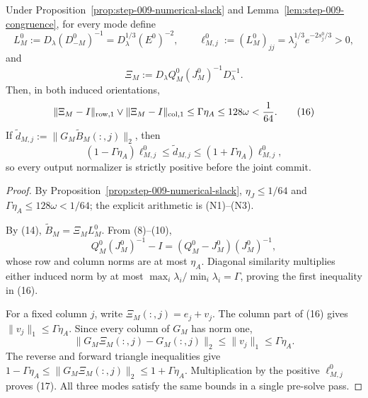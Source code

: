\begin{proposition}\label{prop:step-009-normalizer}
Under Proposition~\ref{prop:step-009-numerical-slack}
and Lemma~\ref{lem:step-009-congruence}, for
every mode define
\[
L_M^0:=D_\lambda(D_{-M}^0)^{-1}
   =D_\lambda^{1/3}(E^0)^{-2},\qquad
\ell_{M,j}^0:=(L_M^0)_{jj}
   =\lambda_j^{1/3}e^{-2s_j^0/3}>0,
\]
and
\[
\Xi_M:=D_\lambda Q_M^0(J_M^0)^{-1}D_\lambda^{-1}.
\]
Then, in both induced orientations,
\[
\|\Xi_M-I\|_{\rm row,1}\vee\|\Xi_M-I\|_{\rm col,1}
\le\Gamma\eta_A\le128\omega<\frac1{64}. \tag{16}
\]
If \(\widetilde d_{M,j}:=\|G_M\widetilde B_M(:,j)\|_2\), then
\[
(1-\Gamma\eta_A)\ell_{M,j}^0
\le\widetilde d_{M,j}
\le(1+\Gamma\eta_A)\ell_{M,j}^0, \tag{17}
\]
so every output normalizer is strictly positive before the joint commit.

\begin{proof}

By Proposition~\ref{prop:step-009-numerical-slack}, \(\eta_J\le1/64\) and
\(\Gamma\eta_A\le128\omega<1/64\); the explicit arithmetic is (N1)--(N3).

By (14), \(\widetilde B_M=\Xi_M L_M^0\). From (8)--(10),
\[
Q_M^0(J_M^0)^{-1}-I
=(Q_M^0-J_M^0)(J_M^0)^{-1},
\]
whose row and column norms are at most \(\eta_A\). Diagonal similarity
multiplies either induced norm by at most
\(\max_i\lambda_i/\min_i\lambda_i=\Gamma\), proving the first inequality
in (16).

For a fixed column \(j\), write \(\Xi_M(:,j)=e_j+v_j\). The column part of
(16) gives \(\|v_j\|_1\le\Gamma\eta_A\). Since every column of \(G_M\) has
norm one,
\[
\|G_M\Xi_M(:,j)-G_M(:,j)\|_2
\le\|v_j\|_1\le\Gamma\eta_A.
\]
The reverse and forward triangle inequalities give
\(1-\Gamma\eta_A\le\|G_M\Xi_M(:,j)\|_2
\le1+\Gamma\eta_A\). Multiplication by the positive
\(\ell_{M,j}^0\) proves (17). All three modes satisfy the same bounds in a
single pre-solve pass. 

\end{proof}
\end{proposition}
